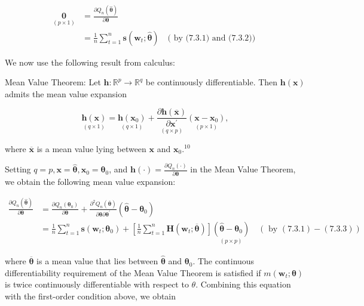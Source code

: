 \documentclass[10pt]{article}
\begin{document}
\begin{align*}
\underset{(p \times 1)}{\mathbf{0}} & =\frac{\partial Q_{n}(\hat{\boldsymbol{\theta}})}{\partial \boldsymbol{\theta}} \\
& =\frac{1}{n} \sum_{t=1}^{n} \mathbf{s}\left(\mathbf{w}_{t} ; \hat{\boldsymbol{\theta}}\right) \quad(\text { by (7.3.1) and (7.3.2)) } \tag{7.3.4}
\end{align*}


We now use the following result from calculus:

Mean Value Theorem: Let $\mathbf{h}: \mathbb{R}^{p} \rightarrow \mathbb{R}^{q}$ be continuously differentiable. Then $\mathbf{h}(\mathbf{x})$ admits the mean value expansion

$$
\underset{(q \times 1)}{\mathbf{h}(\mathbf{x})}=\underset{(q \times 1)}{\mathbf{h}\left(\mathbf{x}_{0}\right)}+\underset{(q \times p)}{\frac{\partial \mathbf{h}(\overline{\mathbf{x}})}{\partial \mathbf{x}^{\prime}}} \underset{(p \times 1)}{\left(\mathbf{x}-\mathbf{x}_{0}\right)},
$$

where $\overline{\mathbf{x}}$ is a mean value lying between $\mathbf{x}$ and $\mathbf{x}_{0} .^{10}$

Setting $q=p, \mathbf{x}=\hat{\boldsymbol{\theta}}, \mathbf{x}_{0}=\boldsymbol{\theta}_{0}$, and $\mathbf{h}(\cdot)=\frac{\partial Q_{n}(\cdot)}{\partial \boldsymbol{\theta}}$ in the Mean Value Theorem, we obtain the following mean value expansion:


\begin{align*}
\frac{\partial Q_{n}(\hat{\boldsymbol{\theta}})}{\partial \boldsymbol{\theta}} & =\frac{\partial Q_{n}\left(\boldsymbol{\theta}_{0}\right)}{\partial \boldsymbol{\theta}}+\frac{\partial^{2} Q_{n}(\overline{\boldsymbol{\theta}})}{\partial \boldsymbol{\theta} \partial \boldsymbol{\theta}^{\prime}}\left(\hat{\boldsymbol{\theta}}-\boldsymbol{\theta}_{0}\right) \\
& =\frac{1}{n} \sum_{t=1}^{n} \mathbf{s}\left(\mathbf{w}_{t} ; \boldsymbol{\theta}_{0}\right)+\left[\frac{1}{n} \sum_{t=1}^{n} \mathbf{H}\left(\mathbf{w}_{t} ; \overline{\boldsymbol{\theta}}\right)\right] \underset{(p \times p)}{\left(\hat{\boldsymbol{\theta}}-\boldsymbol{\theta}_{0}\right)} \quad(\text { by }(7.3 .1)-(7.3 .3)) \tag{7.3.5}
\end{align*}


where $\overline{\boldsymbol{\theta}}$ is a mean value that lies between $\hat{\boldsymbol{\theta}}$ and $\boldsymbol{\theta}_{0}$. The continuous differentiability requirement of the Mean Value Theorem is satisfied if $m\left(\mathbf{w}_{t} ; \boldsymbol{\theta}\right)$ is twice continuously differentiable with respect to $\theta$. Combining this equation with the first-order condition above, we obtain
\end{document}
